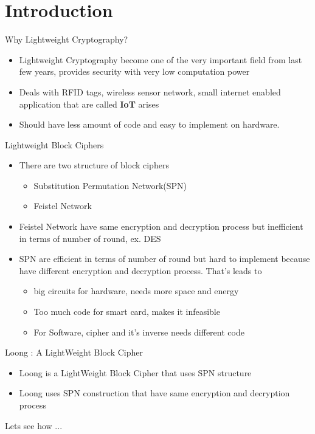 \section{Introduction}
\begin{frame}{Why Lightweight Cryptography?}
\begin{itemize}
    \item Lightweight Cryptography become one of the very important field from last few years, provides security with very low computation power
    \pause
    \item Deals with RFID tags, wireless sensor network, small internet enabled application that are called \textbf{IoT} arises
    \pause
    \item Should have less amount of code and easy to implement on hardware.
\end{itemize}
\end{frame}

\begin{frame}{Lightweight Block Ciphers}
    \begin{itemize}
        \item There are two structure of block ciphers
        \begin{itemize}
            \item Substitution Permutation Network(SPN)
            \item Feistel Network
        \end{itemize}
        \pause
        \item Feistel Network have same encryption and decryption process but inefficient in terms of number of round, ex. DES
        \pause
        \item SPN are efficient in terms of number of round but hard to implement because have different encryption and decryption process. That's leads to
        \pause
        \begin{itemize}
            \item big circuits for hardware, needs more space and energy
            \pause
            \item Too much code for smart card, makes it infeasible
            \pause
            \item For Software, cipher and it's inverse needs different code
        \end{itemize}
    \end{itemize}
\end{frame}





\begin{frame}{Loong : A LightWeight Block Cipher}
    \begin{itemize}
        \item Loong is a LightWeight Block Cipher that uses SPN structure
        \pause
        \item Loong uses SPN construction that have same encryption and decryption process
    \end{itemize}
    \pause
     Lets see how ...
\end{frame}